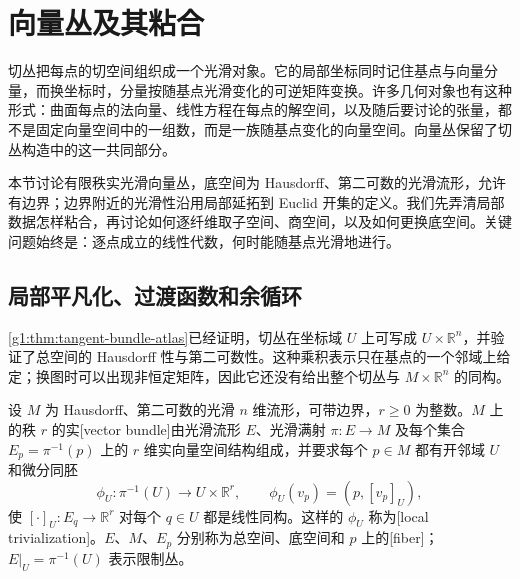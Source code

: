 
% 
% 

\section{向量丛及其粘合}
\label{g1:sec:1201}

切丛把每点的切空间组织成一个光滑对象。它的局部坐标同时记住基点与向量分量，而换坐标时，分量按随基点光滑变化的可逆矩阵变换。许多几何对象也有这种形式：曲面每点的法向量、线性方程在每点的解空间，以及随后要讨论的张量，都不是固定向量空间中的一组数，而是一族随基点变化的向量空间。向量丛保留了切丛构造中的这一共同部分。

\ProseParagraphBreak

本节讨论有限秩实光滑向量丛，底空间为 Hausdorff、第二可数的光滑流形，允许有边界；边界附近的光滑性沿用局部延拓到 Euclid 开集的定义。我们先弄清局部数据怎样粘合，再讨论如何逐纤维取子空间、商空间，以及如何更换底空间。关键问题始终是：逐点成立的线性代数，何时能随基点光滑地进行。

\subsection{局部平凡化、过渡函数和余循环}
\label{g1:subsec:1201:01}

\cref{g1:thm:tangent-bundle-atlas}已经证明，切丛在坐标域 \(U\) 上可写成 \(U\times\mathbb R^n\)，并验证了总空间的 Hausdorff 性与第二可数性。这种乘积表示只在基点的一个邻域上给定；换图时可以出现非恒定矩阵，因此它还没有给出整个切丛与 \(M\times\mathbb R^n\) 的同构。

\begin{definition}
	\label{g1:def:vector-bundle}
	设 \(M\) 为 Hausdorff、第二可数的光滑 \(n\) 维流形，可带边界，\(r\geq0\) 为整数。\(M\) 上的秩 \(r\) 的实[vector bundle]由光滑流形 \(E\)、光滑满射 \(\pi:E\to M\) 及每个集合 \(E_p=\pi^{-1}(p)\) 上的 \(r\) 维实向量空间结构组成，并要求每个 \(p\in M\) 都有开邻域 \(U\) 和微分同胚
	\[
		\phi_U:\pi^{-1}(U)\longrightarrow U\times\mathbb R^r,
		\qquad \phi_U(v_p)=(p,[v_p]_U),
	\]
	使 \([\cdot]_U:E_q\to\mathbb R^r\) 对每个 \(q\in U\) 都是线性同构。这样的 \(\phi_U\) 称为[local trivialization]。\(E\)、\(M\)、\(E_p\) 分别称为总空间、底空间和 \(p\) 上的[fiber]；\(E|_U=\pi^{-1}(U)\) 表示限制丛。
\end{definition}

